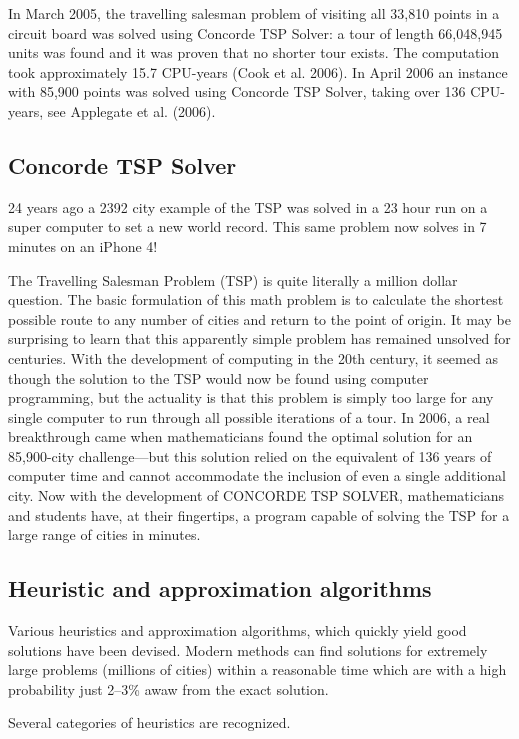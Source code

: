 In March 2005, the travelling salesman problem of visiting all 33,810 points in a circuit board was solved using Concorde TSP Solver: a tour of length 66,048,945 units was found and it was proven that no shorter tour exists. The computation took approximately 15.7 CPU-years (Cook et al. 2006). In April 2006 an instance with 85,900 points was solved using Concorde TSP Solver, taking over 136 CPU-years, see Applegate et al. (2006).

\subsection{Concorde TSP Solver}
24 years ago a 2392 city example of the TSP was solved in a 23 hour run on a super computer to set a new world record. This same problem now solves in 7 minutes on an iPhone 4!

The Travelling Salesman Problem (TSP) is quite literally a million dollar question. The basic formulation of this math problem is to calculate the shortest possible route to any number of cities and return to the point of origin. It may be surprising to learn that this apparently simple problem has remained unsolved for centuries. With the development of computing in the 20th century, it seemed as though the solution to the TSP would now be found using
computer programming, but the actuality is that this problem is simply too large for any single computer to run through all possible iterations of a tour. In 2006, a real breakthrough came when mathematicians found the optimal solution for an 85,900-city challenge—but this solution relied on the equivalent of 136 years of computer time and cannot accommodate the inclusion of even a single additional city. Now with the development of CONCORDE TSP SOLVER, mathematicians and students have, at their fingertips, a program capable of solving the TSP for a large range of cities in minutes.

\subsection{Heuristic and approximation algorithms}

Various heuristics and approximation algorithms, which quickly yield good solutions have been devised. Modern methods can find solutions for extremely large problems (millions of cities) within a reasonable time which are with a high probability just 2–3\% awaw from the exact solution.

Several categories of heuristics are recognized.

